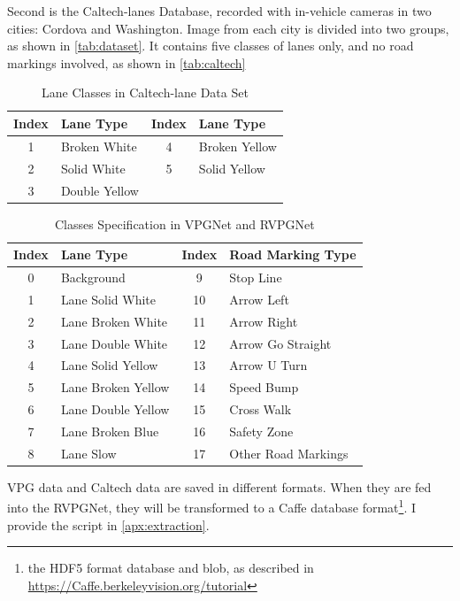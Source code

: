 \begin{spacing}{1.5}
Second is the Caltech-lanes Database, recorded with in-vehicle cameras in two cities: Cordova and Washington. Image from each city is divided into two groups, as shown in \autoref{tab:dataset}. It contains five classes of lanes only, and no road markings involved, as shown in \autoref{tab:caltech}

\begin{table}[ht]
\centering
\caption{Lane Classes in Caltech-lane Data Set}
\label{tab:caltech}
\begin{tabular}{@{}clcl@{}}
\toprule
Index & Lane Type & Index & Lane Type \\ \midrule
1 & Broken White & 4 & Broken Yellow \\
2 & Solid White & 5 & Solid Yellow \\
3 & Double Yellow & \multicolumn{1}{l}{} &  \\ \bottomrule
\end{tabular}
\end{table}


\begin{table}[ht]
\centering
\caption{Classes Specification in VPGNet and RVPGNet}
\label{tab:classes}
\begin{tabular}{clcl}
\toprule
Index & Lane Type          & Index & Road Marking Type   \\ \midrule
0     & Background         & 9     & Stop Line           \\
1     & Lane Solid White   & 10    & Arrow Left          \\
2     & Lane Broken White  & 11    & Arrow Right         \\
3     & Lane Double White  & 12    & Arrow Go Straight   \\
4     & Lane Solid Yellow  & 13    & Arrow U Turn        \\
5     & Lane Broken Yellow & 14    & Speed Bump          \\
6     & Lane Double Yellow & 15    & Cross Walk          \\
7     & Lane Broken Blue   & 16    & Safety Zone         \\
8     & Lane Slow          & 17    & Other Road Markings \\ \bottomrule
\end{tabular}
\end{table}%

VPG data and Caltech data are saved in different formats. When they are fed into the RVPGNet, they will be transformed to a Caffe database format\footnote{the HDF5 format database and blob, as described in \url{https://Caffe.berkeleyvision.org/tutorial}}. I provide the script in \autoref{apx:extraction}.


\end{spacing}
